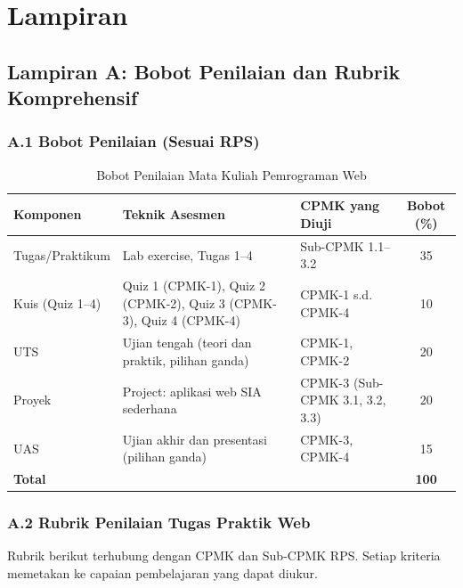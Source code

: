 \chapter*{Lampiran}

\section*{Lampiran A: Bobot Penilaian dan Rubrik Komprehensif}

\subsection*{A.1 Bobot Penilaian (Sesuai RPS)}

\begin{table}[htbp]
\centering
\small
\begin{tabular}{|>{\raggedright\arraybackslash}p{3.2cm}|>{\raggedright\arraybackslash}p{5.5cm}|>{\raggedright\arraybackslash}p{3.8cm}|c|}
\hline
\textbf{Komponen} & \textbf{Teknik Asesmen} & \textbf{CPMK yang Diuji} & \textbf{Bobot (\%)} \\
\hline
Tugas/Praktikum & Lab exercise, Tugas 1--4 & Sub-CPMK 1.1--3.2 & 35 \\
\hline
Kuis (Quiz 1--4) & Quiz 1 (CPMK-1), Quiz 2 (CPMK-2), Quiz 3 (CPMK-3), Quiz 4 (CPMK-4) & CPMK-1 s.d. CPMK-4 & 10 \\
\hline
UTS & Ujian tengah (teori dan praktik, pilihan ganda) & CPMK-1, CPMK-2 & 20 \\
\hline
Proyek & Project: aplikasi web SIA sederhana & CPMK-3 (Sub-CPMK 3.1, 3.2, 3.3) & 20 \\
\hline
UAS & Ujian akhir dan presentasi (pilihan ganda) & CPMK-3, CPMK-4 & 15 \\
\hline
\textbf{Total} & & & \textbf{100} \\
\hline
\end{tabular}
\caption{Bobot Penilaian Mata Kuliah Pemrograman Web}
\end{table}

\subsection*{A.2 Rubrik Penilaian Tugas Praktik Web}

Rubrik berikut terhubung dengan CPMK dan Sub-CPMK RPS. Setiap kriteria memetakan ke capaian pembelajaran yang dapat diukur.

